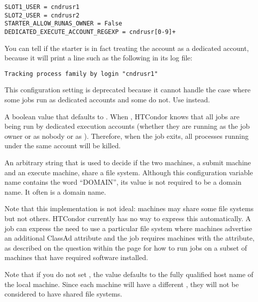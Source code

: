 \begin{description}
\begin{verbatim}
SLOT1_USER = cndrusr1
SLOT2_USER = cndrusr2
STARTER_ALLOW_RUNAS_OWNER = False
DEDICATED_EXECUTE_ACCOUNT_REGEXP = cndrusr[0-9]+
\end{verbatim}

  You can tell if the starter is in fact treating the account as a
  dedicated account, because it will print a line such as the following
  in its log file:

\begin{verbatim}
Tracking process family by login "cndrusr1"
\end{verbatim}


\label{param:ExecuteLoginIsDedicated}
\item[\Macro{EXECUTE\_LOGIN\_IS\_DEDICATED}]
  This configuration setting is deprecated because it cannot handle the
  case where some jobs run as dedicated accounts and some do not.  Use
   instead.

  A boolean value that defaults to .  When ,
  HTCondor knows that all jobs are being run by dedicated execution
  accounts (whether they are running as the job owner or as nobody or as
  ).  Therefore, when the job exits, all processes
  running under the same account will be killed.

\label{param:FilesystemDomain}
\item[\Macro{FILESYSTEM\_DOMAIN}]
  An arbitrary string that is used to decide if
  the two machines, a submit machine and an execute machine,
  share a file system.
  Although this configuration variable name contains the word ``DOMAIN'',
  its value is not required to be a domain name. 
  It often is a domain name.

  Note that this implementation is not ideal: machines may share some
  file systems but not others. HTCondor currently has no way to express
  this automatically. 
  A job can express the need to use a particular file system where
  machines advertise an additional ClassAd attribute
  and the job requires machines with the attribute, 
  as described on the question within the
  page for how to run jobs on a subset of machines that have required
  software installed.

  Note that if you do not set 
  , the value defaults
  to the fully qualified host name of the local machine.
  Since each machine will have a different
  ,
  they will not be considered to have shared file systems.
  

\end{description}
